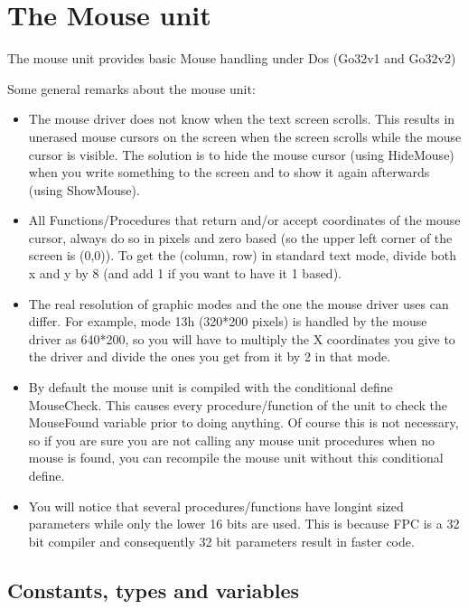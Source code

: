 \chapter{The Mouse unit}

The mouse unit provides basic Mouse handling under Dos (Go32v1 and Go32v2)

Some general remarks about the mouse unit:

\begin{itemize}
\item The mouse driver does not know when the text screen scrolls. This results
in unerased mouse cursors on the screen when the screen scrolls while the
mouse cursor is visible. The solution is to hide the mouse cursor (using
HideMouse) when you write something to the screen and to show it again
afterwards (using ShowMouse).

\item All Functions/Procedures that return and/or accept coordinates of the mouse
cursor, always do so in pixels and zero based (so the upper left corner of
the screen is (0,0)). To get the (column, row) in standard text mode, divide
both x and y by 8 (and add 1 if you want to have it 1 based).

\item The real resolution of graphic modes and the one the mouse driver uses can
differ. For example, mode 13h (320*200 pixels) is handled by the mouse driver
as 640*200, so you will have to multiply the X coordinates you give to the
driver and divide the ones you get from it by 2 in that mode.

\item By default the mouse unit is compiled with the conditional define
MouseCheck. This causes every procedure/function of the unit to check the
MouseFound variable prior to doing anything. Of course this is not necessary,
so if you are sure you are not calling any mouse unit procedures when no
mouse is found, you can recompile the mouse unit without this conditional
define.

\item
You will notice that several procedures/functions have longint sized
parameters while only the lower 16 bits are used. This is because FPC is
a 32 bit compiler and consequently 32 bit parameters result in faster code.
\end{itemize}

\section{Constants, types and variables}

